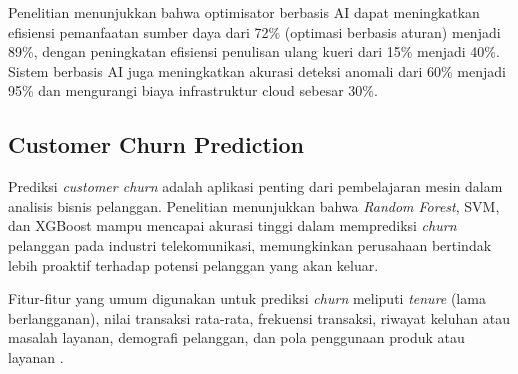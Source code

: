 Penelitian \textcite{shah2024ai} menunjukkan bahwa optimisator berbasis AI dapat meningkatkan efisiensi pemanfaatan sumber daya dari 72\% (optimasi berbasis aturan) menjadi 89\%, dengan peningkatan efisiensi penulisan ulang kueri dari 15\% menjadi 40\%. Sistem berbasis AI juga meningkatkan akurasi deteksi anomali dari 60\% menjadi 95\% dan mengurangi biaya infrastruktur cloud sebesar 30\%.

\subsection{Customer Churn Prediction}

Prediksi \textit{customer churn} adalah aplikasi penting dari pembelajaran mesin dalam analisis bisnis pelanggan. Penelitian \textcite{lalwani2022customer} menunjukkan bahwa \textit{Random Forest}, SVM, dan XGBoost mampu mencapai akurasi tinggi dalam memprediksi \textit{churn} pelanggan pada industri telekomunikasi, memungkinkan perusahaan bertindak lebih proaktif terhadap potensi pelanggan yang akan keluar.

Fitur-fitur yang umum digunakan untuk prediksi \textit{churn} meliputi \textit{tenure} (lama berlangganan), nilai transaksi rata-rata, frekuensi transaksi, riwayat keluhan atau masalah layanan, demografi pelanggan, dan pola penggunaan produk atau layanan \parencite{lalwani2022customer}.






